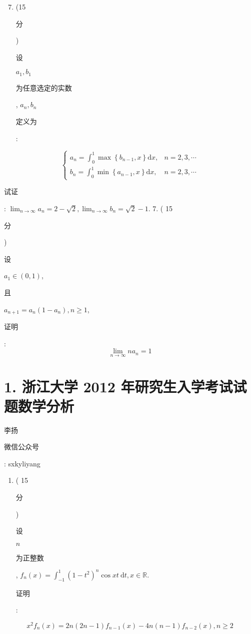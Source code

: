 \documentclass[10pt]{article}
\begin{document}
\begin{enumerate}
  \setcounter{enumi}{6}
  \item (15 \begin{CJK}{UTF8}{mj}分\end{CJK}) \begin{CJK}{UTF8}{mj}设\end{CJK} $a_{1}, b_{1}$ \begin{CJK}{UTF8}{mj}为任意选定的实数\end{CJK}, $a_{n}, b_{n}$ \begin{CJK}{UTF8}{mj}定义为\end{CJK}:
\end{enumerate}
$$
\begin{cases}a_{n}=\int_{0}^{1} \max \left\{b_{n-1}, x\right\} \mathrm{d} x, & n=2,3, \cdots \\ b_{n}=\int_{0}^{1} \min \left\{a_{n-1}, x\right\} \mathrm{d} x, & n=2,3, \cdots\end{cases}
$$
\begin{CJK}{UTF8}{mj}试证\end{CJK}: $\lim _{n \rightarrow \infty} a_{n}=2-\sqrt{2}, \lim _{n \rightarrow \infty} b_{n}=\sqrt{2}-1 .$ 7. ( 15 \begin{CJK}{UTF8}{mj}分\end{CJK}) \begin{CJK}{UTF8}{mj}设\end{CJK} $a_{1} \in(0,1)$, \begin{CJK}{UTF8}{mj}且\end{CJK} $a_{n+1}=a_{n}\left(1-a_{n}\right), n \geqslant 1$, \begin{CJK}{UTF8}{mj}证明\end{CJK}:
$$
\lim _{n \rightarrow \infty} n a_{n}=1
$$

\section{1. 浙江大学 2012 年研究生入学考试试题数学分析}
\begin{CJK}{UTF8}{mj}李扬\end{CJK}

\begin{CJK}{UTF8}{mj}微信公众号\end{CJK}: sxkyliyang

\begin{enumerate}
  \item ( 15 \begin{CJK}{UTF8}{mj}分\end{CJK}) \begin{CJK}{UTF8}{mj}设\end{CJK} $n$ \begin{CJK}{UTF8}{mj}为正整数\end{CJK}, $f_{n}(x)=\int_{-1}^{1}\left(1-t^{2}\right)^{n} \cos x t \mathrm{~d} t, x \in \mathbb{R}$. \begin{CJK}{UTF8}{mj}证明\end{CJK}:
\end{enumerate}
$$
x^{2} f_{n}(x)=2 n(2 n-1) f_{n-1}(x)-4 n(n-1) f_{n-2}(x), n \geqslant 2
$$
\end{document}
